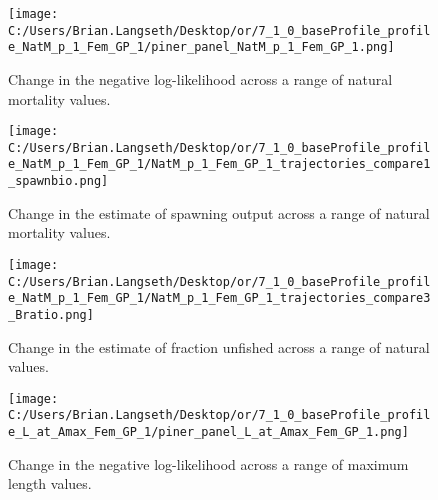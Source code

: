 \documentclass[11pt,
  english,
  a4paper,
]{article}
\begin{document}
\begin{figure}
\centering
\texttt{[image: C:/Users/Brian.Langseth/Desktop/or/7\_1\_0\_baseProfile\_profile\_NatM\_p\_1\_Fem\_GP\_1/piner\_panel\_NatM\_p\_1\_Fem\_GP\_1.png]}
\caption{Change in the negative log-likelihood across a range of natural mortality values.\label{fig:m-profile}}
\end{figure}

\tagmcend\tagstructend


\begin{figure}
\centering
\texttt{[image: C:/Users/Brian.Langseth/Desktop/or/7\_1\_0\_baseProfile\_profile\_NatM\_p\_1\_Fem\_GP\_1/NatM\_p\_1\_Fem\_GP\_1\_trajectories\_compare1\_spawnbio.png]}
\caption{Change in the estimate of spawning output across a range of natural mortality values.\label{fig:m-ssb}}
\end{figure}

\tagmcend\tagstructend


\begin{figure}
\centering
\texttt{[image: C:/Users/Brian.Langseth/Desktop/or/7\_1\_0\_baseProfile\_profile\_NatM\_p\_1\_Fem\_GP\_1/NatM\_p\_1\_Fem\_GP\_1\_trajectories\_compare3\_Bratio.png]}
\caption{Change in the estimate of fraction unfished across a range of natural values.\label{fig:m-depl}}
\end{figure}

\tagmcend\tagstructend


\begin{figure}
\centering
\texttt{[image: C:/Users/Brian.Langseth/Desktop/or/7\_1\_0\_baseProfile\_profile\_L\_at\_Amax\_Fem\_GP\_1/piner\_panel\_L\_at\_Amax\_Fem\_GP\_1.png]}
\caption{Change in the negative log-likelihood across a range of maximum length values.\label{fig:linf-profile}}
\end{figure}

\tagmcend\tagstructend
\end{document}
